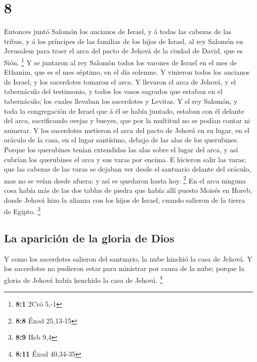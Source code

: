 \hypertarget{section-7}{%
\section{8}\label{section-7}}

 Entonces juntó Salomón los ancianos de Israel, y á todas
las cabezas de las tribus, y á los príncipes de las familias de los
hijos de Israel, al rey Salomón en Jerusalem para traer el arca del
pacto de Jehová de la ciudad de David, que es Sión. \footnote{\textbf{8:1}
  2Cró 5,-1}  Y se juntaron al rey Salomón todos los varones
de Israel en el mes de Ethanim, que es el mes séptimo, en el día
solemne.  Y vinieron todos los ancianos de Israel, y los
sacerdotes tomaron el arca.  Y llevaron el arca de Jehová, y
el tabernáculo del testimonio, y todos los vasos sagrados que estaban en
el tabernáculo; los cuales llevaban los sacerdotes y Levitas.
 Y el rey Salomón, y toda la congregación de Israel que á él
se había juntado, estaban con él delante del arca, sacrificando ovejas y
bueyes, que por la multitud no se podían contar ni numerar. 
Y los sacerdotes metieron el arca del pacto de Jehová en su lugar, en el
oráculo de la casa, en el lugar santísimo, debajo de las alas de los
querubines.  Porque los querubines tenían extendidas las
alas sobre el lugar del arca, y así cubrían los querubines el arca y sus
varas por encima.  E hicieron salir las varas; que las
cabezas de las varas se dejaban ver desde el santuario delante del
oráculo, mas no se veían desde afuera: y así se quedaron hasta hoy.
\footnote{\textbf{8:8} Éxod 25,13-15}  En el arca ninguna
cosa había más de las dos tablas de piedra que había allí puesto Moisés
en Horeb, donde Jehová hizo la alianza con los hijos de Israel, cuando
salieron de la tierra de Egipto. \footnote{\textbf{8:9} Heb 9,4}

\hypertarget{la-apariciuxf3n-de-la-gloria-de-dios}{%
\subsection{La aparición de la gloria de
Dios}\label{la-apariciuxf3n-de-la-gloria-de-dios}}

 Y como los sacerdotes salieron del santuario, la nube
hinchió la casa de Jehová.  Y los sacerdotes no pudieron
estar para ministrar por causa de la nube; porque la gloria de Jehová
había henchido la casa de Jehová. \footnote{\textbf{8:11} Éxod 40,34-35}

